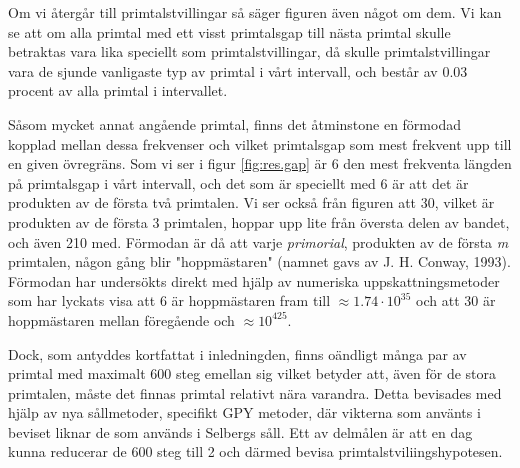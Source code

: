 Om vi återgår till primtalstvillingar så säger figuren även något om dem. 
Vi kan se att om alla primtal med ett visst primtalsgap till nästa primtal skulle betraktas vara lika speciellt som primtalstvillingar, då skulle primtalstvillingar vara de sjunde vanligaste typ av primtal i vårt intervall, och består av 0.03 procent av alla primtal i intervallet.

Såsom mycket annat angående primtal, finns det åtminstone en förmodad kopplad mellan dessa frekvenser och vilket primtalsgap som mest frekvent upp till en given övregräns. 
Som vi ser i figur \ref{fig:res.gap} är 6 den mest frekventa längden på primtalsgap i vårt intervall, och det som är speciellt med 6 är att det är produkten av de första två primtalen. 
Vi ser också från figuren att 30, vilket är produkten av de första 3 primtalen, hoppar upp lite från översta delen av bandet, och även 210 med. Förmodan är då att varje \textit{primorial}, produkten av de första \textit{m} primtalen, någon gång blir "hoppmästaren" (namnet gavs av J. H. Conway, 1993).
Förmodan har undersökts direkt med hjälp av numeriska uppskattningsmetoder \cite{primeGap} som har lyckats visa att 6 är hoppmästaren fram till \(\approx 1.74\cdot10^{35}\) och att 30 är hoppmästaren mellan föregående och \(\approx 10^{425}\).

Dock, som antyddes kortfattat i inledningden, finns oändligt många par av primtal med maximalt 600 steg emellan sig vilket betyder att, även för de stora primtalen, måste det finnas primtal relativt nära varandra.
Detta bevisades med hjälp av nya sållmetoder, specifikt GPY metoder, där vikterna som använts i beviset liknar de som används i Selbergs såll. 
Ett av delmålen är att en dag kunna reducerar de 600 steg till 2 och därmed bevisa primtalstviliingshypotesen.

